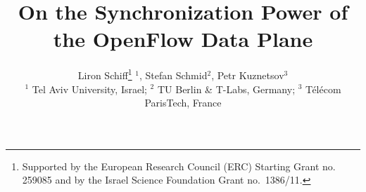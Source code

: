 \documentclass[conference]{sigcomm-alternate}
\begin{document}
\sloppy





\title{On the Synchronization Power of the OpenFlow Data Plane}




\author{
Liron Schiff\thanks{Supported by the European Research Council (ERC) Starting Grant no. 259085 and by the Israel Science Foundation Grant no.~1386/11.} $^1$,
Stefan Schmid$^2$, Petr Kuznetsov$^3$ \\
\small $^1$ Tel Aviv University, Israel; $^2$ TU Berlin \& T-Labs,
Germany; $^3$ T\'el\'ecom ParisTech, France
}


\date{}


\maketitle


\thispagestyle{empty}


\end{document}
